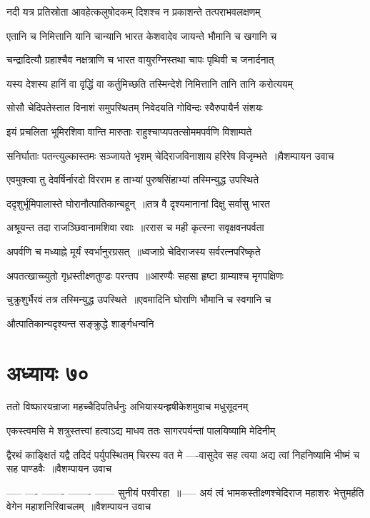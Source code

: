 \twolineshloka
{नदी यत्र प्रतिस्रोता आवहेत्कलुषोदकम्}
{दिशश्च न प्रकाशन्ते तत्पराभवलक्षणम्}


\twolineshloka
{एतानि च निमित्तानि यानि चान्यानि भारत}
{केशवादेव जायन्ते भौमानि च खगानि च}


\twolineshloka
{चन्द्रादित्यौ ग्रहाश्चैव नक्षत्राणि च भारत}
{वायुरग्निस्तथा चापः पृथिवी च जनार्दनात्}


\twolineshloka
{यस्य देशस्य हानिं वा वृद्धिं वा कर्तुमिच्छति}
{तस्मिन्देशे निमित्तानि तानि तानि करोत्ययम्}


\twolineshloka
{सोसौ चेदिपतेस्तात विनाशं समुपस्थितम्}
{निवेदयति गोविन्दः स्वैरुपायैर्न संशयः}


\twolineshloka
{इयं प्रचलिता भूमिरशिवा वान्ति मारुताः}
{राहुश्चाप्यपतत्सोममपर्वणि विशाम्पते}


\twolineshloka
{सनिर्घाताः पतन्त्युल्कास्तमः सञ्जायते भृशम्}
{चेदिराजविनाशाय हरिरेष विजृम्भते ॥वैशम्पायन उवाच}


\threelineshloka
{एवमुक्त्वा तु देवर्षिर्नारदो विरराम ह}
{ताभ्यां पुरुषसिंहाभ्यां तस्मिन्युद्ध उपस्थिते}
{}


\twolineshloka
{ददृशुर्भूमिपालास्ते घोरानौत्पातिकान्बहून् ॥तत्र वै दृश्यमानानां दिक्षु सर्वासु भारत}
{}


\twolineshloka
{अश्रूयन्त तदा राजञ्छिवानामशिवा रवाः ॥ररास च मही कृत्स्ना सवृक्षवनपर्वता}
{}


\twolineshloka
{अपर्वणि च मध्याह्ने मूर्यं स्वर्भानुरग्रसत् ॥ध्वजाग्रे चेदिराजस्य सर्वरत्नपरिष्कृते}
{}


\twolineshloka
{अपतत्खाच्च्युतो गृध्रस्तीक्ष्णतुण्डः परन्तप ॥आरण्यैः सहसा हृष्टा ग्राम्याश्च मृगपक्षिणः}
{}


\twolineshloka
{चुक्रुशुर्भैरवं तत्र तस्मिन्युद्ध उपस्थिते ॥एवमादिनि घोराणि भौमानि च स्वगानि च}
{}


औत्पातिकान्यदृश्यन्त सङ्क्रुद्धे शार्ङ्गधन्वनि
\chapter{अध्यायः ७०}
\twolineshloka
{ततो विष्फारयन्राजा महच्चैदिपतिर्धनुः}
{अभियास्यन्हृषीकेशमुवाच मधुसूदनम्}


\twolineshloka
{एकस्त्वमसि मे शत्रुस्तत्त्वां हत्वाऽद्य माधव}
{ततः सागरपर्यन्तां पालयिष्यामि मेदिनीम्}


\fourlineindentedshloka
{द्वैरथं काङ्क्षितं यद्वै तदिदं पर्युपस्थितम्}
{चिरस्य वत मे ----वासुदेव सह त्वया}
{अद्य त्वां निहनिष्यामि भीष्मं च सह पाण्डवैः ॥वैशम्पायन उवाच}
{}


-----
----
-------
-------
------ सुनीयं परवीरहा ॥-----
\threelineshloka
{अयं त्वं भामकस्तीक्ष्णश्चेदिराज महाशरः}
{भेत्तुमर्हति वेगेन महाशनिरिवाचलम् ॥वैशम्पायन उवाच}
{}


